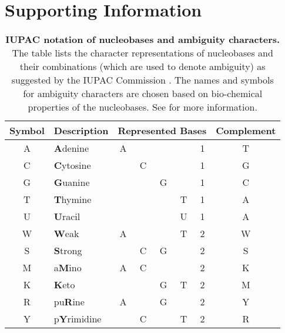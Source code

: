 
\chapter{Supporting Information}
\label{ch:SupportingInformation}

\begin{table}[htb]
\caption[IUPAC notation of nucleobases and ambiguity characters]{
\textbf{IUPAC notation of nucleobases and ambiguity characters.}
The table lists the character representations of nucleobases and their combinations
(which are used to denote ambiguity) as suggested by the IUPAC Commission \cite{IUPAC1970}.
The names and symbols for ambiguity characters are chosen based on bio-chemical properties of the nucleobases.
See  for more information.
}
\label{tab:AmbiguityCharacters}
{
    \newcommand{\mc}[3]{\multicolumn{#1}{#2}{#3}}
    \newcommand{\rb}{\cellcolor{black!12}}
    \begin{center}
    \begin{tabular}{c|l|cccc|c|c}
    Symbol & Description & \mc{5}{c|}{Represented Bases} & Complement \\
    \hline
    A & \textbf{A}denine & \rb{} A &  &  &  & 1 & T \\
    C & \textbf{C}ytosine &  & \rb{} C &  &  & 1 & G \\
    G & \textbf{G}uanine &  &  & \rb{} G &  & 1 & C \\
    T & \textbf{T}hymine &  &  &  & \rb{} T & 1 & A \\
    U & \textbf{U}racil &  &  &  & \rb{} U & 1 & A \\
    \hline
    W & \textbf{W}eak & \rb{} A &  &  & \rb{} T & 2 & W \\
    S & \textbf{S}trong &  & \rb{} C & \rb{} G &  & 2 & S \\
    M & a\textbf{M}ino & \rb{} A & \rb{} C &  &  & 2 & K \\
    K & \textbf{K}eto &  &  & \rb{} G & \rb{} T & 2 & M \\
    R & pu\textbf{R}ine & \rb{} A &  & \rb{} G &  & 2 & Y \\
    Y & p\textbf{Y}rimidine &  & \rb{} C &  & \rb{} T & 2 & R \\

\end{tabular}
\end{center}}
\end{table}
